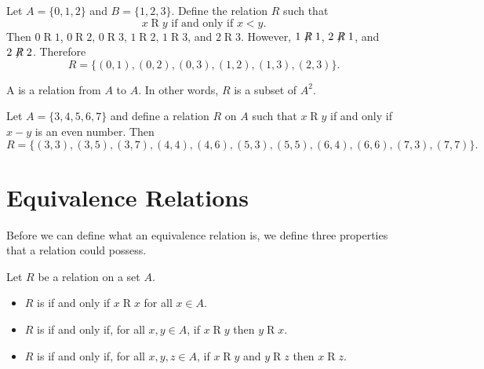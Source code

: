 \begin{example}
    Let $A = \{0, 1, 2\}$ and $B = \{1, 2, 3\}$. Define the relation $R$ such that
    \[
        x\mathrel{R}y \text{ if and only if } x < y.
    \]
    Then $0\mathrel{R}1$, $0\mathrel{R}2$, $0\mathrel{R}3$, $1\mathrel{R}2$, $1\mathrel{R}3$, and $2\mathrel{R}3$. However, $1\not\mathrel{R}1$, $2\not\mathrel{R}1$, and $2\not\mathrel{R}2$. Therefore
    \[
        R = \{(0, 1), (0, 2), (0, 3), (1, 2), (1, 3), (2, 3)\}.
    \]
\end{example}

\begin{definition}
    A  is a relation from $A$ to $A$. In other words, $R$ is a subset of $A^2$.
\end{definition}
\begin{example}
    Let $A = \{3, 4, 5, 6, 7\}$ and define a relation $R$ on $A$ such that $x\mathrel{R}y$ if and only if $x - y$ is an even number. Then
    \[
        R = \{(3, 3), (3, 5), (3, 7), (4, 4), (4, 6), (5, 3), (5, 5), (6, 4), (6, 6), (7, 3), (7, 7)\}.
    \]
\end{example}

\section{Equivalence Relations}
Before we can define what an equivalence relation is, we define three properties that a relation could possess.
\begin{definition}
    Let $R$ be a relation on a set $A$.
    \begin{itemize}
        \item $R$ is  if and only if $x\mathrel{R}x$ for all $x \in A$.
        \item $R$ is  if and only if, for all $x, y \in A$, if $x\mathrel{R}y$ then $y\mathrel{R}x$.
        \item $R$ is  if and only if, for all $x,y,z\in A$, if $x\mathrel{R}y$ and $y\mathrel{R}z$ then $x\mathrel{R}z$.
    \end{itemize}
\end{definition}

